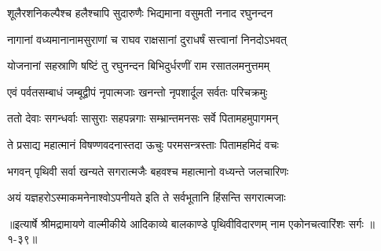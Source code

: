\twolineshloka
{शूलैरशनिकल्पैश्च हलैश्चापि सुदारुणैः}
{भिद्यमाना वसुमती ननाद रघुनन्दन} %

\twolineshloka
{नागानां वध्यमानानामसुराणां च राघव}
{राक्षसानां दुराधर्षं सत्त्वानां निनदोऽभवत्} %

\twolineshloka
{योजनानां सहस्राणि षष्टिं तु रघुनन्दन}
{बिभिदुर्धरणीं राम रसातलमनुत्तमम्} %

\twolineshloka
{एवं पर्वतसम्बाधं जम्बूद्वीपं नृपात्मजाः}
{खनन्तो नृपशार्दूल सर्वतः परिचक्रमुः} %

\twolineshloka
{ततो देवाः सगन्धर्वाः सासुराः सहपन्नगाः}
{सम्भ्रान्तमनसः सर्वे पितामहमुपागमन्} %

\twolineshloka
{ते प्रसाद्य महात्मानं विषण्णवदनास्तदा}
{ऊचुः परमसन्त्रस्ताः पितामहमिदं वचः} %

\twolineshloka
{भगवन् पृथिवी सर्वा खन्यते सगरात्मजैः}
{बहवश्च महात्मानो वध्यन्ते जलचारिणः} %

\twolineshloka
{अयं यज्ञहरोऽस्माकमनेनाश्वोऽपनीयते}
{इति ते सर्वभूतानि हिंसन्ति सगरात्मजाः} %


॥इत्यार्षे श्रीमद्रामायणे वाल्मीकीये आदिकाव्ये बालकाण्डे पृथिवीविदारणम् नाम एकोनचत्वारिंशः सर्गः ॥१-३९॥
